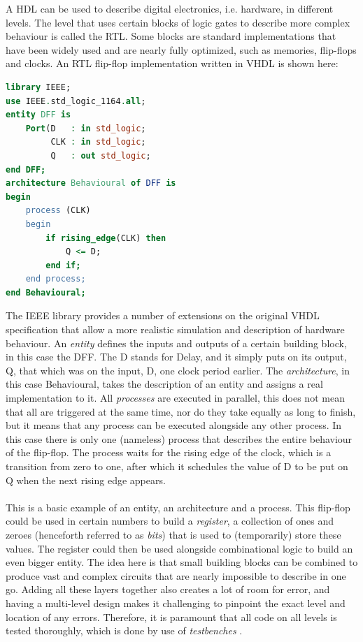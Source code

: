 \documentclass[11pt,british]{article}
\begin{document}
A \gls{HDL} can be used to describe digital electronics, i.e. hardware, in different levels. The level that uses certain blocks of logic gates to describe more complex behaviour is called the \gls{RTL}. Some blocks are standard implementations that have been widely used and are nearly fully optimized, such as memories, flip-flops and clocks. An \gls{RTL} flip-flop implementation written in \gls{VHDL} is shown here: 
\begin{lstlisting}[language=VHDL, tabsize=4, frame=single, framesep=2mm, belowskip=16pt, aboveskip=16pt, showstringspaces=false]
library IEEE;
use IEEE.std_logic_1164.all;
entity DFF is
	Port(D 	 : in std_logic;
		 CLK : in std_logic;
		 Q 	 : out std_logic;
end DFF;
architecture Behavioural of DFF is
begin
	process (CLK)
	begin
		if rising_edge(CLK) then
			Q <= D;
		end if;
	end process;
end Behavioural;
\end{lstlisting}
The \gls{IEEE} library provides a number of extensions on the original \gls{VHDL} specification that allow a more realistic simulation and description of hardware behaviour. An \emph{entity} defines the inputs and outputs of a certain building block, in this case the \gls{DFF}. The D stands for Delay, and it simply puts on its output, Q, that which was on the input, D, one clock period earlier. The \emph{architecture}, in this case Behavioural, takes the description of an entity and assigns a real implementation to it. All \emph{processes} are executed in parallel, this does not mean that all are triggered at the same time, nor do they take equally as long to finish, but it means that any process can be executed alongside any other process. In this case there is only one (nameless) process that describes the entire behaviour of the flip-flop. The process waits for the rising edge of the clock, which is a transition from zero to one, after which it schedules the value of D to be put on Q when the next rising edge appears.
\\
\\
This is a basic example of an entity, an architecture and a process. This flip-flop could be used in certain numbers to build a \emph{register}, a collection of ones and zeroes (henceforth referred to as \emph{bits}) that is used to (temporarily) store these values. The register could then be used alongside combinational logic to build an even bigger entity. The idea here is that small building blocks can be combined to produce vast and complex circuits that are nearly impossible to describe in one go. Adding all these layers together also creates a lot of room for error, and having a multi-level design makes it challenging to pinpoint the exact level and location of any errors. Therefore, it is paramount that all code on all levels is tested thoroughly, which is done by use of \emph{testbenches} \cite{bergeron00}.
\end{document}
